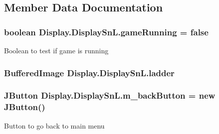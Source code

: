 \subsection{Member Data Documentation}
\hypertarget{class_display_1_1_display_sn_l_a539641b8ae0dae1e3106d2f0717fe55d}{}
\subsubsection[{game\+Running}]{\setlength{\rightskip}{0pt plus 5cm}boolean Display.\+Display\+Sn\+L.\+game\+Running = false\hspace{0.3cm}{\ttfamily [private]}}\label{class_display_1_1_display_sn_l_a539641b8ae0dae1e3106d2f0717fe55d}
Boolean to test if game is running \hypertarget{class_display_1_1_display_sn_l_a4f2e517153c6066a9ba3d627728ed51c}{}
\subsubsection[{ladder}]{\setlength{\rightskip}{0pt plus 5cm}Buffered\+Image Display.\+Display\+Sn\+L.\+ladder\hspace{0.3cm}{\ttfamily [private]}}\label{class_display_1_1_display_sn_l_a4f2e517153c6066a9ba3d627728ed51c}
\hypertarget{class_display_1_1_display_sn_l_a9452f0a663eaea507cf3561851e5c74e}{}
\subsubsection[{m\+\_\+back\+Button}]{\setlength{\rightskip}{0pt plus 5cm}J\+Button Display.\+Display\+Sn\+L.\+m\+\_\+back\+Button = new J\+Button()\hspace{0.3cm}{\ttfamily [private]}}\label{class_display_1_1_display_sn_l_a9452f0a663eaea507cf3561851e5c74e}
Button to go back to main menu \hypertarget{class_display_1_1_display_sn_l_aafb6d505956de58bbd229a789342ef19}{}
